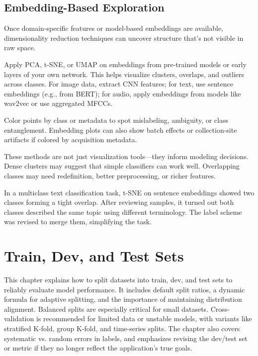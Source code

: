 \documentclass[12pt,openany]{book}
\begin{document}
\section{Embedding-Based Exploration}

Once domain-specific features or model-based embeddings are available, dimensionality reduction techniques can uncover structure that’s not visible in raw space.
\newline

Apply PCA, t-SNE, or UMAP on embeddings from pre-trained models or early layers of your own network. This helps visualize clusters, overlaps, and outliers across classes. For image data, extract CNN features; for text, use sentence embeddings (e.g., from BERT); for audio, apply embeddings from models like wav2vec or use aggregated MFCCs.
\newline

Color points by class or metadata to spot mislabeling, ambiguity, or class entanglement. Embedding plots can also show batch effects or collection-site artifacts if colored by acquisition metadata.
\newline

These methods are not just visualization tools—they inform modeling decisions. Dense clusters may suggest that simple classifiers can work well. Overlapping classes may need redefinition, better preprocessing, or richer features.

\begin{examplebox}
In a multiclass text classification task, t-SNE on sentence embeddings showed two classes forming a tight overlap. After reviewing samples, it turned out both classes described the same topic using different terminology. The label scheme was revised to merge them, simplifying the task.
\end{examplebox}




\chapter{Train, Dev, and Test Sets}

\begin{summarybox}
This chapter explains how to split datasets into train, dev, and test sets to reliably evaluate model performance. It includes default split ratios, a dynamic formula for adaptive splitting, and the importance of maintaining distribution alignment. Balanced splits are especially critical for small datasets. Cross-validation is recommended for limited data or unstable models, with variants like stratified K-fold, group K-fold, and time-series splits. The chapter also covers systematic vs. random errors in labels, and emphasizes revising the dev/test set or metric if they no longer reflect the application’s true goals.
\end{summarybox}
\end{document}
